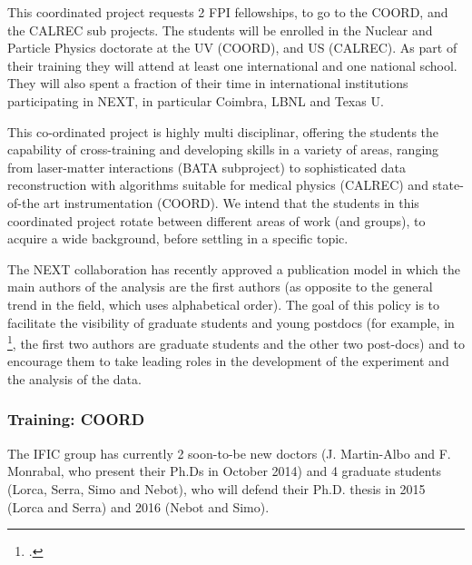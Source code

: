 This coordinated project requests 2 FPI fellowships, to go to the COORD, and the CALREC sub projects. The students will be enrolled in the Nuclear and Particle Physics doctorate at the UV (COORD), and US (CALREC). As part of their training they will attend at least one international and one national school. They will also spent a fraction of their time in international institutions participating in NEXT, in particular Coimbra, LBNL and Texas U. 

This co-ordinated project is  highly multi disciplinar, offering the students the capability of cross-training and developing skills in a variety of areas, ranging from laser-matter interactions (BATA subproject) to sophisticated data reconstruction with algorithms suitable for medical physics (CALREC) and state-of-the art instrumentation (COORD). We intend that the students in this coordinated project rotate between different areas of work (and groups), to acquire a wide background, before settling in a specific topic. 

The NEXT collaboration has recently approved a publication model in which the main authors of the analysis are the first authors (as opposite to the general trend in the field, which uses alphabetical order). The goal of this policy is to facilitate the visibility of graduate students and young postdocs (for example, in \footcite{Lorca:2014sra}, the first two authors are graduate students and the other two post-docs) and to encourage them to take leading roles in the development of the experiment and the analysis of the data. 

\subsubsection*{Training: COORD}
The IFIC group has currently 2 soon-to-be new doctors (J. Martin-Albo and F. Monrabal, who present their Ph.Ds in October 2014) and 4 graduate students (Lorca, Serra, Simo and Nebot), who will defend their Ph.D. thesis in 2015 (Lorca and Serra) and 2016 (Nebot and Simo). 

